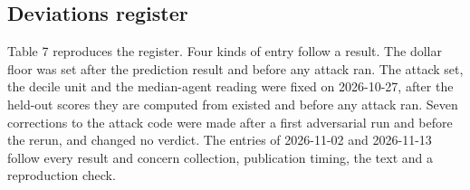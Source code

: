 \documentclass[
  11pt,
  a4paper,
]{article}
\begin{document}
\hypertarget{deviations-register}{%
\subsection{Deviations register}\label{deviations-register}}

Table 7 reproduces the register. Four kinds of entry follow a result.
The dollar floor was set after the prediction result and before any
attack ran. The attack set, the decile unit and the median-agent reading
were fixed on 2026-10-27, after the held-out scores they are computed
from existed and before any attack ran. Seven corrections to the attack
code were made after a first adversarial run and before the rerun, and
changed no verdict. The entries of 2026-11-02 and 2026-11-13 follow
every result and concern collection, publication timing, the text and a
reproduction check.
\end{document}
